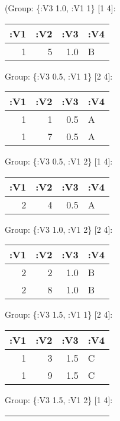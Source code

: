 \documentclass[]{article}
\newenvironment{Shaded}{\begin{snugshade}}{\end{snugshade}}
\newcommand{\DecValTok}[1]{\textcolor[rgb]{0.00,0.00,0.81}{#1}}
\newcommand{\StringTok}[1]{\textcolor[rgb]{0.31,0.60,0.02}{#1}}
\newcommand{\AttributeTok}[1]{\textcolor[rgb]{0.77,0.63,0.00}{#1}}
\newcommand{\NormalTok}[1]{#1}
\begin{document}
(Group: \{:V3 1.0, :V1 1\} {[}1 4{]}:

\begin{longtable}[]{@{}rrrl@{}}
\toprule
:V1 & :V2 & :V3 & :V4\tabularnewline
\midrule
\endhead
1 & 5 & 1.0 & B\tabularnewline
\bottomrule
\end{longtable}

Group: \{:V3 0.5, :V1 1\} {[}2 4{]}:

\begin{longtable}[]{@{}rrrl@{}}
\toprule
:V1 & :V2 & :V3 & :V4\tabularnewline
\midrule
\endhead
1 & 1 & 0.5 & A\tabularnewline
1 & 7 & 0.5 & A\tabularnewline
\bottomrule
\end{longtable}

Group: \{:V3 0.5, :V1 2\} {[}1 4{]}:

\begin{longtable}[]{@{}rrrl@{}}
\toprule
:V1 & :V2 & :V3 & :V4\tabularnewline
\midrule
\endhead
2 & 4 & 0.5 & A\tabularnewline
\bottomrule
\end{longtable}

Group: \{:V3 1.0, :V1 2\} {[}2 4{]}:

\begin{longtable}[]{@{}rrrl@{}}
\toprule
:V1 & :V2 & :V3 & :V4\tabularnewline
\midrule
\endhead
2 & 2 & 1.0 & B\tabularnewline
2 & 8 & 1.0 & B\tabularnewline
\bottomrule
\end{longtable}

Group: \{:V3 1.5, :V1 1\} {[}2 4{]}:

\begin{longtable}[]{@{}rrrl@{}}
\toprule
:V1 & :V2 & :V3 & :V4\tabularnewline
\midrule
\endhead
1 & 3 & 1.5 & C\tabularnewline
1 & 9 & 1.5 & C\tabularnewline
\bottomrule
\end{longtable}

Group: \{:V3 1.5, :V1 2\} {[}1 4{]}:

\begin{longtable}[]{@{}rrrl@{}}
\toprule
:V1 & :V2 & :V3 & :V4\tabularnewline
\midrule
\endhead
2 & 6 & 1.5 & C\tabularnewline
\bottomrule
\end{longtable}

)

\begin{center}\rule{0.5\linewidth}{0.5pt}\end{center}

Grouping can be done by providing just row indexes. This way you can
assign the same row to more than one group.

\begin{Shaded}
\begin{Highlighting}[]
\NormalTok{(api/group-by DS \{}\StringTok{"group-a"}\NormalTok{ [}\DecValTok{1} \DecValTok{2} \DecValTok{1} \DecValTok{2}\NormalTok{]}
                  \StringTok{"group-b"}\NormalTok{ [}\DecValTok{5} \DecValTok{5} \DecValTok{5} \DecValTok{1}\NormalTok{]\} \{}\AttributeTok{:result-type} \AttributeTok{:as-seq}\NormalTok{\})}
\end{Highlighting}
\end{Shaded}
\end{document}
